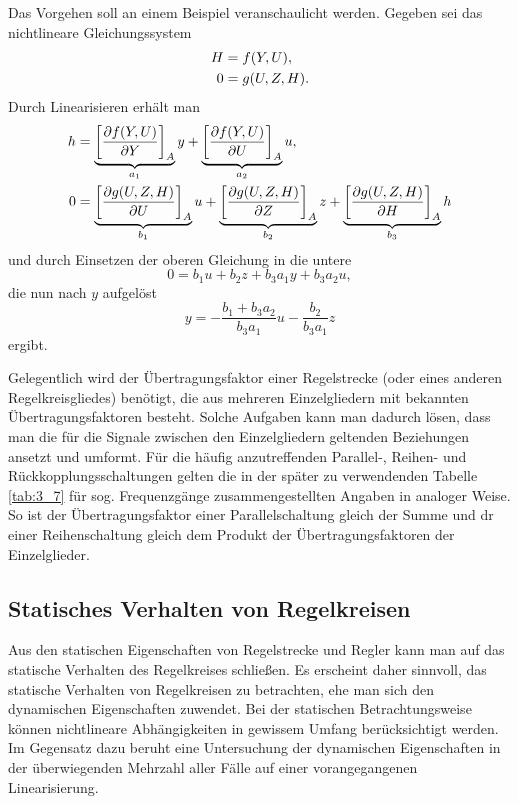 Das Vorgehen soll an einem Beispiel veranschaulicht werden.
Gegeben sei das nichtlineare Gleichungssystem
\begin{align}
    \begin{split}
        H &= f\parentheses*{Y, U},\\
        0 &= g\parentheses*{U, Z, H}.
    \end{split}
\end{align}
Durch Linearisieren erhält man
\begin{align}
    h &= \underbrace{\brackets*{\frac{\partial f\parentheses*{Y, U}}{\partial Y}}_A}_{a_1}y + \underbrace{\brackets*{\frac{\partial f\parentheses*{Y, U}}{\partial U}}_A}_{a_2}u,\\
    0 &= \underbrace{\brackets*{\frac{\partial g\parentheses*{U, Z, H}}{\partial U}}_A}_{b_1}u + \underbrace{\brackets*{\frac{\partial g\parentheses*{U, Z, H}}{\partial Z}}_A}_{b_2}z + \underbrace{\brackets*{\frac{\partial g\parentheses*{U, Z, H}}{\partial H}}_A}_{b_3}h
\end{align}
und durch Einsetzen der oberen Gleichung in die untere
\begin{equation}
    0 = b_1 u + b_2 z + b_3 a_1 y + b_3 a_2 u,
\end{equation}
die nun nach \(y\) aufgelöst
\begin{equation}
    y = -\frac{b_1 + b_3 a_2}{b_3 a_1}u - \frac{b_2}{b_3 a_1}z
\end{equation}
ergibt.

Gelegentlich wird der Übertragungsfaktor einer Regelstrecke (oder eines anderen Regelkreisgliedes) benötigt, die aus mehreren Einzelgliedern mit bekannten Übertragungsfaktoren besteht.
Solche Aufgaben kann man dadurch lösen, dass man die für die Signale zwischen den Einzelgliedern geltenden Beziehungen ansetzt und umformt.
Für die häufig anzutreffenden Parallel-, Reihen- und Rückkopplungsschaltungen gelten die in der später zu verwendenden Tabelle \ref{tab:3_7} für sog. Frequenzgänge zusammengestellten Angaben in analoger Weise.
So ist der Übertragungsfaktor einer Parallelschaltung gleich der Summe und dr einer Reihenschaltung gleich dem Produkt der Übertragungsfaktoren der Einzelglieder.


\subsection{Statisches Verhalten von Regelkreisen}

Aus den statischen Eigenschaften von Regelstrecke und Regler kann man auf das statische Verhalten des Regelkreises schließen.
Es erscheint daher sinnvoll, das statische Verhalten von Regelkreisen zu betrachten, ehe man sich den dynamischen Eigenschaften zuwendet.
Bei der statischen Betrachtungsweise können nichtlineare Abhängigkeiten in gewissem Umfang berücksichtigt werden.
Im Gegensatz dazu beruht eine Untersuchung der dynamischen Eigenschaften in der überwiegenden Mehrzahl aller Fälle auf einer vorangegangenen Linearisierung.

